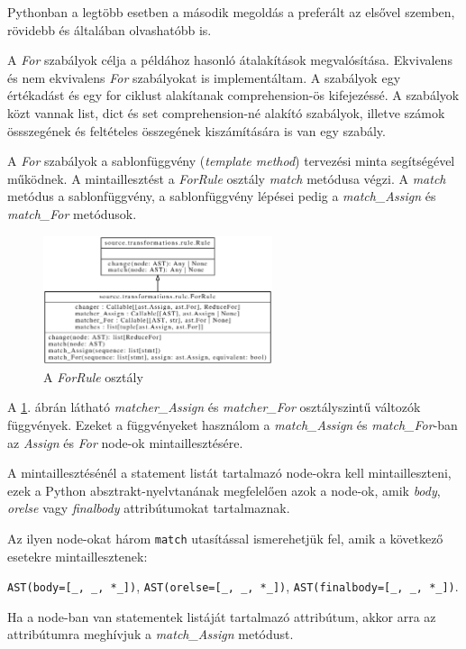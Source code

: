 Pythonban a legtöbb esetben a második megoldás a preferált az elsővel szemben,
rövidebb és általában olvashatóbb is.

A \emph{For} szabályok célja a példához hasonló átalakítások megvalósítása.
Ekvivalens és nem ekvivalens \emph{For} szabályokat is implementáltam.
A szabályok egy értékadást és egy for ciklust alakítanak comprehension-ös kifejezéssé.
A szabályok közt vannak list, dict és set comprehension-né alakító szabályok,
illetve számok össszegének és feltételes összegének kiszámítására is van egy szabály.

A \emph{For} szabályok a sablonfüggvény (\emph{template method})
tervezési minta segítségével működnek.
A mintaillesztést a \emph{ForRule} osztály \emph{match} metódusa végzi.
A \emph{match} metódus a sablonfüggvény,
a sablonfüggvény lépései pedig
a \emph{match\_Assign} és \emph{match\_For} metódusok.

\begin{figure}[H]
	\centering
	\includegraphics[width=0.6\textwidth]{images/uml/ForRule.eps}
	\caption{\label{fig:ForRule}A \emph{ForRule} osztály}
\end{figure}

A \ref{fig:ForRule}. ábrán látható
\emph{matcher\_Assign} és \emph{matcher\_For} osztályszintű változók függvények.
Ezeket a függvényeket használom a
\emph{match\_Assign} és \emph{match\_For}-ban az \emph{Assign} és \emph{For}
node-ok mintaillesztésére.

A mintaillesztésénél a statement listát tartalmazó node-okra kell mintailleszteni,
ezek a Python absztrakt-nyelvtanának megfelelően azok a node-ok,
amik \emph{body}, \emph{orelse} vagy \emph{finalbody} attribútumokat tartalmaznak.

Az ilyen node-okat három \texttt{match} utasítással ismerehetjük fel,
amik a következő esetekre mintaillesztenek:

\lstinline{AST(body=[_, _, *_])},
\lstinline{AST(orelse=[_, _, *_])},
\lstinline{AST(finalbody=[_, _, *_])}.

Ha a node-ban van statementek listáját tartalmazó attribútum,
akkor arra az attribútumra meghívjuk a \emph{match\_Assign} metódust.

